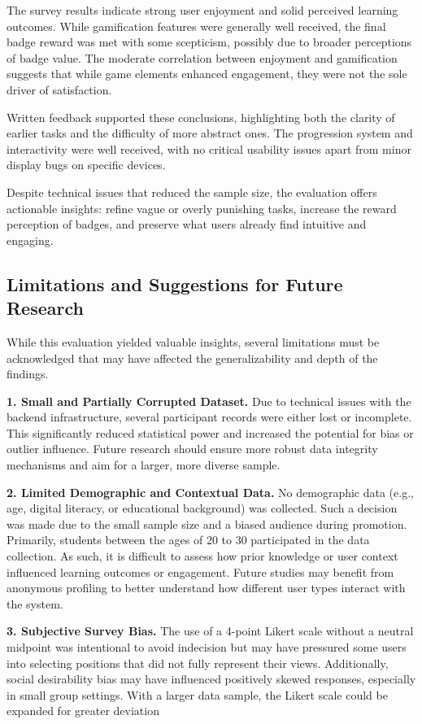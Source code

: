 The survey results indicate strong user enjoyment and solid perceived learning outcomes. 
While gamification features were generally well received, the final badge reward was met with some scepticism, possibly due to broader perceptions of badge value. 
The moderate correlation between enjoyment and gamification suggests that while game elements enhanced engagement, they were not the sole driver of satisfaction.

Written feedback supported these conclusions, highlighting both the clarity of earlier tasks and the difficulty of more abstract ones. 
The progression system and interactivity were well received, with no critical usability issues apart from minor display bugs on specific devices.

Despite technical issues that reduced the sample size, the evaluation offers actionable insights: refine vague or overly punishing tasks, increase the reward perception of badges, and preserve what users already find intuitive and engaging. 

\subsection{Limitations and Suggestions for Future Research}

While this evaluation yielded valuable insights, several limitations must be acknowledged that may have affected the generalizability and depth of the findings.

\textbf{1. Small and Partially Corrupted Dataset.}
Due to technical issues with the backend infrastructure, several participant records were either lost or incomplete. 
This significantly reduced statistical power and increased the potential for bias or outlier influence. 
Future research should ensure more robust data integrity mechanisms and aim for a larger, more diverse sample.

\textbf{2. Limited Demographic and Contextual Data.}
No demographic data (e.g., age, digital literacy, or educational background) was collected. 
Such a decision was made due to the small sample size and a biased audience during promotion. 
Primarily, students between the ages of 20 to 30 participated in the data collection. 
As such, it is difficult to assess how prior knowledge or user context influenced learning outcomes or engagement. 
Future studies may benefit from anonymous profiling to better understand how different user types interact with the system.

\textbf{3. Subjective Survey Bias.}
The use of a 4-point Likert scale without a neutral midpoint was intentional to avoid indecision but may have pressured some users into selecting positions that did not fully represent their views. 
Additionally, social desirability bias may have influenced positively skewed responses, especially in small group settings. 
With a larger data sample, the Likert scale could be expanded for greater deviation

